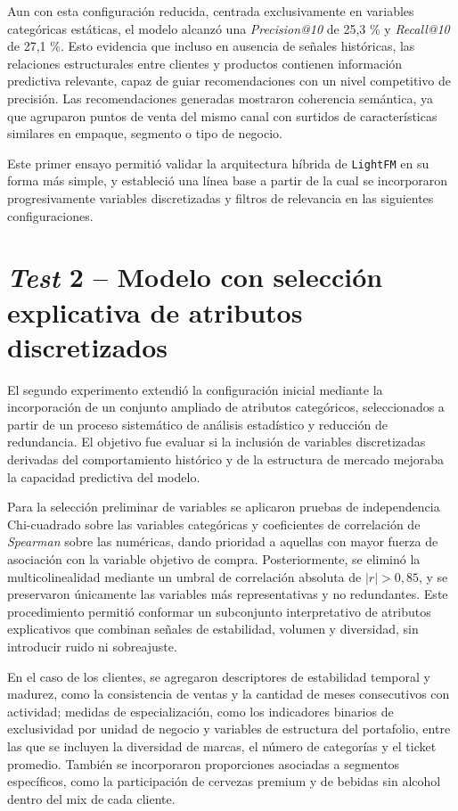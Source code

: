 Aun con esta configuración reducida, centrada exclusivamente en variables categóricas estáticas, el modelo alcanzó una \textit{Precision@10} de 25{,}3 \% y \textit{Recall@10} de 27{,}1 \%. Esto evidencia que incluso en ausencia de señales históricas, las relaciones estructurales entre clientes y productos contienen información predictiva relevante, capaz de guiar recomendaciones con un nivel competitivo de precisión. Las recomendaciones generadas mostraron coherencia semántica, ya que agruparon puntos de venta del mismo canal con surtidos de características similares en empaque, segmento o tipo de negocio.

Este primer ensayo permitió validar la arquitectura híbrida de \texttt{LightFM} en su forma más simple, y estableció una línea base a partir de la cual se incorporaron progresivamente variables discretizadas y filtros de relevancia en las siguientes configuraciones.

\section{\textit{Test} 2 – Modelo con selección explicativa de atributos discretizados}

El segundo experimento extendió la configuración inicial mediante la incorporación de un conjunto ampliado de atributos categóricos, seleccionados a partir de un proceso sistemático de análisis estadístico y reducción de redundancia. El objetivo fue evaluar si la inclusión de variables discretizadas derivadas del comportamiento histórico y de la estructura de mercado mejoraba la capacidad predictiva del modelo.

Para la selección preliminar de variables se aplicaron pruebas de independencia Chi-cuadrado sobre las variables categóricas y coeficientes de correlación de \textit{Spearman} sobre las numéricas, dando prioridad a aquellas con mayor fuerza de asociación con la variable objetivo de compra. Posteriormente, se eliminó la multicolinealidad mediante un umbral de correlación absoluta de $|r| > 0{,}85$, y se preservaron únicamente las variables más representativas y no redundantes. Este procedimiento permitió conformar un subconjunto interpretativo de atributos explicativos que combinan señales de estabilidad, volumen y diversidad, sin introducir ruido ni sobreajuste.

En el caso de los clientes, se agregaron descriptores de estabilidad temporal y madurez, como la consistencia de ventas y la cantidad de meses consecutivos con actividad; medidas de especialización, como los indicadores binarios de exclusividad por unidad de negocio y variables de estructura del portafolio, entre las que se incluyen la diversidad de marcas, el número de categorías y el ticket promedio. También se incorporaron proporciones asociadas a segmentos específicos, como la participación de cervezas premium y de bebidas sin alcohol dentro del mix de cada cliente.

